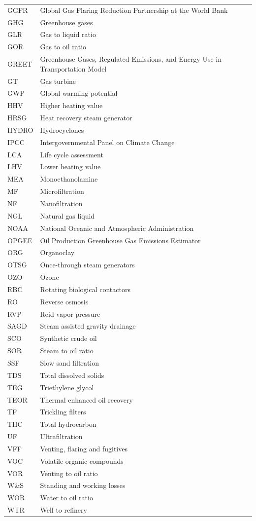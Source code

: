 \documentclass[11pt]{report}
\begin{document}
\begin{scriptsize}
\begin{supertabular*}{1\columnwidth}{p{0.15\columnwidth}p{0.8\columnwidth}}
GGFR & Global Gas Flaring Reduction Partnership at the World Bank\\
GHG & Greenhouse gases\\
GLR & Gas to liquid ratio\\
GOR & Gas to oil ratio\\
GREET & Greenhouse Gases, Regulated Emissions, and Energy Use in Transportation Model\\
GT & Gas turbine\\
GWP & Global warming potential\\
HHV & Higher heating value\\
HRSG & Heat recovery steam generator\\
HYDRO & Hydrocyclones\\
IPCC & Intergovernmental Panel on Climate Change\\
LCA & Life cycle assessment\\
LHV & Lower heating value\\
MEA & Monoethanolamine\\
MF & Microfiltration\\
NF & Nanofiltration\\
NGL & Natural gas liquid\\
NOAA & National Oceanic and Atmospheric Administration\\
OPGEE & Oil Production Greenhouse Gas Emissions Estimator\\
ORG & Organoclay\\
OTSG & Once-through steam generators\\
OZO & Ozone\\
RBC & Rotating biological contactors\\
RO & Reverse osmosis\\
RVP & Reid vapor pressure \\
SAGD & Steam assisted gravity drainage\\
SCO & Synthetic crude oil\\
SOR & Steam to oil ratio\\
SSF & Slow sand filtration\\
TDS & Total dissolved solids\\
TEG & Triethylene glycol\\
TEOR & Thermal enhanced oil recovery\\
TF & Trickling filters\\
THC & Total hydrocarbon\\
UF & Ultrafiltration\\
VFF & Venting, flaring and fugitives\\
VOC & Volatile organic compounds\\
VOR & Venting to oil ratio\\
W\&S & Standing and working losses \\
WOR & Water to oil ratio\\
WTR & Well to refinery\\
\end{supertabular*}
\end{scriptsize}
\end{document}
